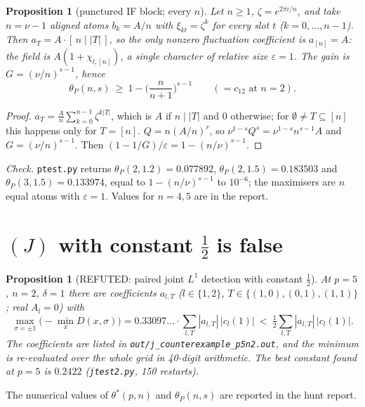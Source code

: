 \documentclass[11pt]{article}
\newtheorem{proposition}[theorem]{Proposition}
\theoremstyle{remark}
\begin{document}
\begin{proposition}[punctured IF block; every $n$]\label{prop:punct}
Let $n\ge1$, $\zeta=e^{2\pi i/n}$, and take $n=\nu-1$ aligned atoms $b_k=A/n$ with $\xi_{kt}=\zeta^{k}$ for every slot $t$ ($k=0,\dots,n-1$).  Then
$a_T=A\cdot[\,n\mid |T|\,]$, so the only nonzero fluctuation coefficient is $a_{[n]}=A$: the field is $A(1+\chi_{l,[n]})$, a single character
of relative size $\varepsilon=1$.  The gain is $G=(\nu/n)^{s-1}$, hence
\[\theta_P(n,s)\ \ge\ 1-\Big(\frac{n}{n+1}\Big)^{s-1}\qquad(=c_{12}\text{ at }n=2).\]
\end{proposition}
\begin{proof}
$a_T=\frac An\sum_{k=0}^{n-1}\zeta^{k|T|}$, which is $A$ if $n\mid|T|$ and $0$ otherwise; for $\emptyset\neq T\subseteq[n]$ this happens only for $T=[n]$.
$Q=n(A/n)^r$, so $\nu^{1-s}Q^s=\nu^{1-s}n^{s-1}A$ and $G=(\nu/n)^{s-1}$.  Then $(1-1/G)/\varepsilon=1-(n/\nu)^{s-1}$.
\end{proof}
\emph{Check.} \texttt{ptest.py} returns $\theta_P(2,1.2)=0.077892$, $\theta_P(2,1.5)=0.183503$ and $\theta_P(3,1.5)=0.133974$, equal to
$1-(n/\nu)^{s-1}$ to $10^{-6}$; the maximisers are $n$ equal atoms with $\varepsilon=1$.  Values for $n=4,5$ are in the report.

\section{$(J)$ with constant $\frac12$ is false}
\begin{proposition}[REFUTED: paired joint $L^1$ detection with constant $\frac12$]
At $p=5$, $n=2$, $\delta=1$ there are coefficients $a_{l,T}$ ($l\in\{1,2\}$, $T\in\{(1,0),(0,1),(1,1)\}$; real $A_l=0$) with
\[\max_{\sigma=\pm1}\Big(-\min_x D(x,\sigma)\Big)=0.33097\ldots\cdot\sum_{l,T}|a_{l,T}|\,|c_l(1)|\ <\ \tfrac12\sum_{l,T}|a_{l,T}|\,|c_l(1)|.\]
The coefficients are listed in \texttt{out/j\_counterexample\_p5n2.out}, and the minimum is re-evaluated over the whole grid in 40-digit
arithmetic.  The best constant found at $p=5$ is $0.2422$ (\texttt{jtest2.py}, 150 restarts).
\end{proposition}
The numerical values of $\theta^\ast(p,n)$ and $\theta_P(n,s)$ are reported in the hunt report.
\end{document}

